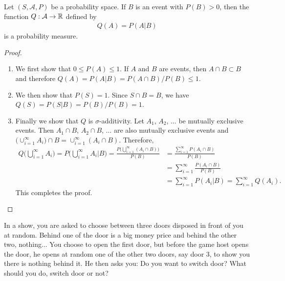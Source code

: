 \begin{theorem}
Let $(S , \mathcal{A} , P )$ be a probability space. If $B$ is an event with $P (B) > 0$, then the function $Q : \mathcal{A} \rightarrow \mathbb{R}$ defined by
	\begin{align*}
	Q (A) = P (A | B)
	\end{align*}
is a probability measure.
\end{theorem}
\begin{proof}
\begin{enumerate}[label=\alph*)]
\item We first show that $0 \leq P (A) \leq 1$. If $A$ and $B$ are events, then $A \cap B \subset B$ and therefore $Q (A) = P (A|B) = P (A \cap B) / P (B) \leq 1$.
\item We then show that $P (S) = 1$. Since $S \cap B = B$, we have $Q(S) = P (S|B) = P (B)/P (B) = 1$.
\item Finally we show that $Q$ is $\sigma$-additivity. Let $A_1$, $A_2$, $\ldots$ be mutually exclusive events. Then $A_1 \cap B$, $A_2 \cap B$, $\ldots$ are also mutually exclusive events and $\big( \cup_{i = 1}^\infty A_i \big) \cap B = \cup_{i = 1}^\infty (A_i \cap B )$. Therefore,
	\begin{align*}
	Q \Big( \bigcup_{i = 1}^\infty A_i \Big) = P \Big( \bigcup_{i = 1}^\infty A_i \Big| B \Big) = \frac{P \Big( \bigcup_{i = 1}^\infty (A_i \cap B) \Big)}{P (B)} &= \frac{\sum_{i = 1}^\infty P (A_i \cap B)}{P (B)} \\
	&= \sum_{i = 1}^\infty \frac{P (A_i \cap B)}{P (B)} \\
	&= \sum_{i = 1}^\infty P (A_i | B) = \sum_{i = 1}^\infty Q (A_i) .
	\end{align*}
This completes the proof. \qedhere
\end{enumerate}

\end{proof}

\begin{example}
In a show, you are asked to choose between three doors disposed in front of you at random. Behind one of the door is a big money price and behind the other two, nothing... You choose to open the first door, but before the game host opens the door, he opens at random one of the other two doors, say door 3, to show you there is nothing behind it. He then asks you: Do you want to switch door? What should you do, switch door or not?
\end{example}

